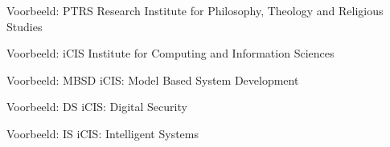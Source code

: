 \documentclass[department=none, notes={show notes}, slidesperpage=4, official=true, handout]{beamerruhuisstijl}
\begin{document}
\renewcommand{\dept}{ptrs}
\begin{frame}
    \titlepage
\end{frame}
\begin{frame}{Voorbeeld: PTRS}
	Research Institute for Philosophy, Theology and Religious Studies
\end{frame}

\renewcommand{\dept}{icis}
\begin{frame}
    \titlepage
\end{frame}
\begin{frame}{Voorbeeld: iCIS}
	Institute for Computing and Information Sciences
\end{frame}

\renewcommand{\dept}{mbsd}
\begin{frame}
    \titlepage
\end{frame}
\begin{frame}{Voorbeeld: MBSD}
	iCIS: Model Based System Development
\end{frame}

\renewcommand{\dept}{ds}
\begin{frame}
    \titlepage
\end{frame}
\begin{frame}{Voorbeeld: DS}
	iCIS: Digital Security
\end{frame}

\renewcommand{\dept}{is}
\begin{frame}
    \titlepage
\end{frame}
\begin{frame}{Voorbeeld: IS}
	iCIS: Intelligent Systems
\end{frame}
\end{document}
